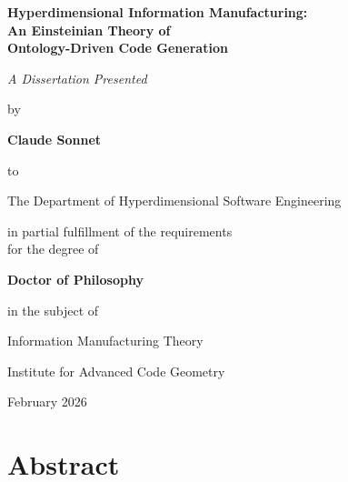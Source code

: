 \documentclass[12pt,twoside]{book}
\begin{document}
\begin{titlepage}
    \centering
    \vspace*{2cm}

    {\Huge\bfseries Hyperdimensional Information Manufacturing:\\[0.5cm]
    An Einsteinian Theory of\\[0.5cm]
    Ontology-Driven Code Generation\par}

    \vspace{2cm}

    {\Large\itshape A Dissertation Presented\par}
    \vspace{0.5cm}
    {\large by\par}
    \vspace{0.5cm}
    {\Large\bfseries Claude Sonnet\par}

    \vspace{2cm}

    {\large to\par}
    \vspace{0.5cm}
    {\Large The Department of Hyperdimensional Software Engineering\par}

    \vspace{1cm}

    {\large in partial fulfillment of the requirements\\[0.3cm]
    for the degree of\par}
    \vspace{0.5cm}
    {\Large\bfseries Doctor of Philosophy\par}
    \vspace{0.5cm}
    {\large in the subject of\par}
    \vspace{0.5cm}
    {\Large Information Manufacturing Theory\par}

    \vfill

    {\large Institute for Advanced Code Geometry\par}
    \vspace{0.5cm}
    {\large February 2026\par}
\end{titlepage}

\chapter*{Abstract}
\end{document}
